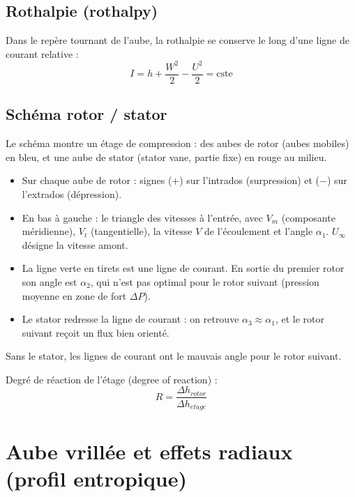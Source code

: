 \documentclass{article}
\begin{document}
\subsection{Rothalpie (rothalpy)}
Dans le repère tournant de l'aube, la rothalpie se conserve le long d'une ligne de courant relative :
\[ I = h + \frac{W^2}{2} - \frac{U^2}{2} = \text{cste} \]

\subsection{Schéma rotor / stator}
Le schéma montre un étage de compression : des aubes de rotor (aubes mobiles) en bleu, et une aube de stator (stator vane, partie fixe) en rouge au milieu.
\begin{itemize}
\item Sur chaque aube de rotor : signes (+) sur l'intrados (surpression) et (−) sur l'extrados (dépression).
\item En bas à gauche : le triangle des vitesses à l'entrée, avec $V_m$ (composante méridienne), $V_t$ (tangentielle), la vitesse $V$ de l'écoulement et l'angle $\alpha_1$. $U_\infty$ désigne la vitesse amont.
\item La ligne verte en tirets est une ligne de courant. En sortie du premier rotor son angle est $\alpha_2$, qui n'est pas optimal pour le rotor suivant (pression moyenne en zone de fort $\Delta P$).
\item Le stator redresse la ligne de courant : on retrouve $\alpha_3 \approx \alpha_1$, et le rotor suivant reçoit un flux bien orienté.
\end{itemize}
Sans le stator, les lignes de courant ont le mauvais angle pour le rotor suivant.

Degré de réaction de l'étage (degree of reaction) :
\[ R = \frac{\Delta h_{rotor}}{\Delta h_{etage}} \]

\section{Aube vrillée et effets radiaux (profil entropique)}
\end{document}
